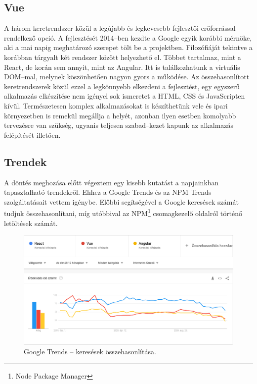 \subsection{Vue}
A három keretrendszer közül a legújabb és legkevesebb fejlesztői erőforrással rendelkező opció.
A fejlesztését 2014–ben kezdte a Google egyik korábbi mérnöke, aki a mai napig meghatározó szerepet tölt be a projektben\cite{Vue}.
Filozófiáját tekintve a korábban tárgyalt két rendszer között helyezhető el. Többet tartalmaz, mint a React, de korán sem annyit, mint az Angular. Itt is találkozhatunk a virtuális DOM–mal, melynek köszönhetően nagyon gyors a működése.
Az összehasonlított keretrendszerek közül ezzel a legkönnyebb elkezdeni a fejlesztést, egy egyszerű alkalmazás elkészítése nem igényel sok ismeretet a HTML, CSS és JavaScripten kívül. Természetesen komplex alkalmazásokat is készíthetünk vele és ipari környezetben is remekül megállja a helyét, azonban ilyen esetben komolyabb tervezésre van szükség, ugyanis teljesen szabad–kezet kapunk az alkalmazás felépítését illetően.

\subsection{Trendek}
A döntés meghozása előtt végeztem egy kisebb kutatást a napjainkban tapasztalható trendekről. Ehhez a Google Trends\cite{GoogleTrends} és az NPM Trends\cite{NPMTrends}  szolgáltatásait vettem igénybe. Előbbi segítségével a Google keresések számát tudjuk összehasonlítani, míg utóbbival az NPM\footnote{Node Package Manager} csomagkezelő oldalról történő letöltések számát.

\begin{figure}[!ht]
  \centering
  \includegraphics[width=150mm, keepaspectratio]{figures/google_trends.png}
  \caption{Google Trends – keresések összehasonlítása.}
  \label{fig:GoogleTrends}
\end{figure}

